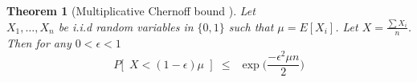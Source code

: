 \documentclass[12pt]{article}
\newtheorem{theorem}{Theorem}
\begin{document}
\begin{theorem}[Multiplicative Chernoff bound \cite{mitzenmacher2005probability}]
\label{thm:chernoff2}
Let\\ $X_1, \ldots, X_n$ be i.i.d random variables in $\{0, 1\}$ such that $\mu = E[X_i]$. Let $X = \frac{\sum X_i}{n}$. Then for any $0 < \epsilon < 1$
$$P\big[ \enspace X < (1-\epsilon) \mu\enspace\big] \enspace\le\enspace \exp\bigg(\frac{-\epsilon^2\mu n}{2}\bigg)$$
\end{theorem}


\ifdefined\COMPLETE
\else
\end{document}
